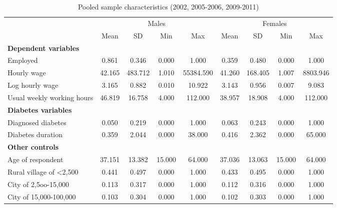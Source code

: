 \documentclass[12pt,english,british]{article}
\newcommand{\sym}[1]{\rlap{#1}}%
\begin{document}
\begin{table}[h]
\caption{\label{tab:Pooled-sample-characteristics }Pooled sample characteristics (2002, 2005-2006, 2009-2011)}
\begin{center}
\begin{adjustbox}{max width=\textwidth}

{ \def\sym#1{\ifmmode^{#1}\else\(^{#1}\)\fi} \begin{tabular}{l*{2}{cccc}}
\toprule
                    &\multicolumn{4}{c}{Males}                          &\multicolumn{4}{c}{Females}                        \\
                    &        Mean&          SD&         Min&         Max&        Mean&          SD&         Min&         Max\\
\midrule
\textbf{Dependent variables} &&&&&&&& \\
Employed            &       0.861&       0.346&       0.000&       1.000&       0.359&       0.480&       0.000&       1.000\\
Hourly wage             &      42.165&     483.712&       1.010&   55384.590&      41.260&     168.405&       1.007&    8803.946\\
Log hourly wage     &       3.165&       0.882&       0.010&      10.922&       3.143&       0.956&       0.007&       9.083\\
Usual weekly working hours&      46.819&      16.758&       4.000&     112.000&      38.957&      18.908&       4.000&     112.000\\
\textbf{Diabetes variables} &&&&&&&& \\
Diagnosed diabetes  &       0.050&       0.219&       0.000&       1.000&       0.063&       0.243&       0.000&       1.000\\
Diabetes duration   &       0.359&       2.044&       0.000&      38.000&       0.416&       2.362&       0.000&      65.000\\
\textbf{Other controls} &&&&&&&& \\
Age of respondent   &      37.151&      13.382&      15.000&      64.000&      37.036&      13.063&      15.000&      64.000\\
Rural village of <2,500&       0.441&       0.497&       0.000&       1.000&       0.433&       0.495&       0.000&       1.000\\
City of 2,5oo-15,000&       0.113&       0.317&       0.000&       1.000&       0.112&       0.316&       0.000&       1.000\\
City of 15,000-100,000&       0.103&       0.304&       0.000&       1.000&       0.102&       0.303&       0.000&       1.000\\

\end{tabular}}
\end{adjustbox}
\end{center}
\end{table}
\end{document}
